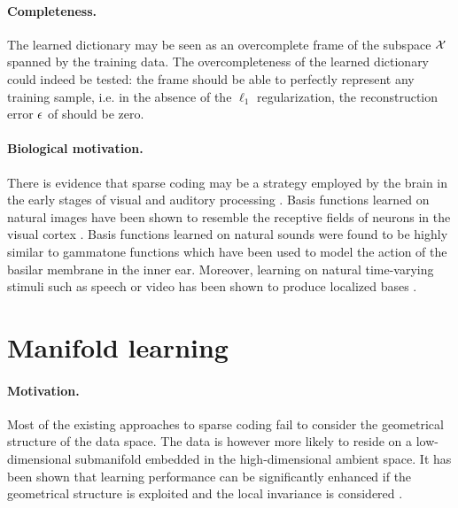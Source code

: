 \paragraph{Completeness.}
The learned dictionary may be seen as an overcomplete frame of the subspace $\mathcal{X}$ spanned by the training data. The overcompleteness of the learned dictionary could indeed be tested: the frame should be able to perfectly represent any training sample, i.e. in the absence of the $\ell_1$ regularization, the reconstruction error $\mathbf{\epsilon}$ of  should be zero.

\paragraph{Biological motivation.}
There is evidence that sparse coding may be a strategy employed by the brain in the early stages of visual and auditory processing \cite{olshausen1996SparseV1, olshausen1997SparseV1, smith2006SparseAudio}. Basis functions learned on natural images have been shown to resemble the receptive fields of neurons in the visual cortex \cite{olshausen1996SparseV1, olshausen1997SparseV1}. Basis functions learned on natural sounds were found to be highly similar to gammatone functions \cite{smith2006SparseAudio} which have been used to model the action of the basilar membrane in the inner ear. Moreover, learning on natural time-varying stimuli such as speech or video has been shown to produce localized bases \cite{lewicki2000SparseSpeech, olshausen2000SparseVideo}.

\section{Manifold learning} \label{sec:manifold_learning}

\paragraph{Motivation.}
Most of the existing approaches to sparse coding fail to consider the geometrical structure of the data space. The data is however more likely to reside on a low-dimensional submanifold embedded in the high-dimensional ambient space.
It has been shown that learning performance can be significantly enhanced if the geometrical structure is exploited and the local invariance is considered  \cite{zheng2011StructuredSparse}.


